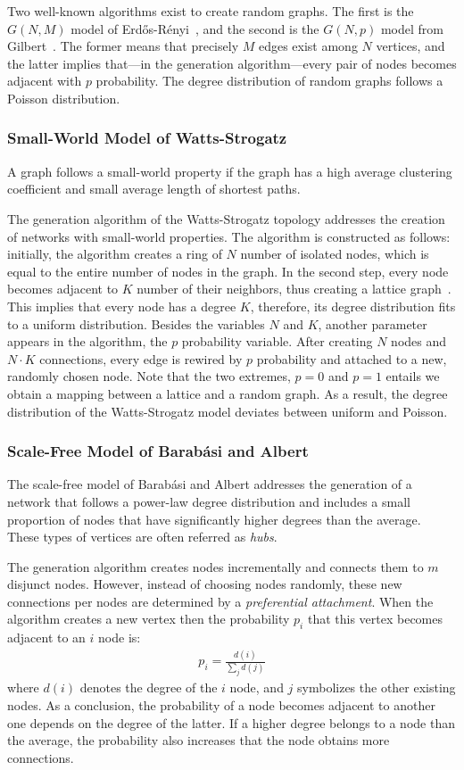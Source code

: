 Two well-known algorithms exist to create random graphs. The first is the $G(N, M)$ model of Erdős-Rényi~\cite{erdos_random}, and the second is the $G(N,p)$ model from Gilbert~\cite{gilbert_random}. The former means that precisely $M$ edges exist among $N$ vertices, and the latter implies that---in the generation algorithm---every pair of nodes becomes adjacent with $p$ probability. The degree distribution of random graphs follows a Poisson distribution.

\subsubsection{Small-World Model of Watts-Strogatz}

A graph follows a small-world property if the graph has a high average clustering coefficient and small average length of shortest paths.

The generation algorithm of the Watts-Strogatz topology addresses the creation of networks with small-world properties. The algorithm is constructed as follows: initially, the algorithm creates a ring of $N$ number of isolated nodes, which is equal to the entire number of nodes in the graph. In the second step, every node becomes adjacent to $K$ number of their neighbors, thus creating a lattice graph~\cite{lattice}. This implies that every node has a degree $K$, therefore, its degree distribution fits to a uniform distribution. Besides the variables $N$ and $K$, another parameter appears in the algorithm, the $p$ probability variable. After creating $N$ nodes and $N \cdot K$ connections, every edge is rewired by $p$ probability and attached to a new, randomly chosen node. Note that the two extremes, $p=0$ and $p=1$ entails we obtain a mapping between a lattice and a random graph. As a result, the degree distribution of the Watts-Strogatz model deviates between uniform and Poisson.

\subsubsection{Scale-Free Model of Barabási and Albert}

The scale-free model of Barabási and Albert addresses the generation of a network that follows a power-law degree distribution and includes a small proportion of nodes that have significantly higher degrees than the average. These types of vertices are often referred as \textit{hubs}.

The generation algorithm creates nodes incrementally and connects them to $m$ disjunct nodes. However, instead of choosing nodes randomly, these new connections per nodes are determined by a \textit{preferential attachment}. When the algorithm creates a new vertex then the probability $p_i$ that this vertex becomes adjacent to an $i$ node is:
\begin{align}
	p_i = \frac{d(i)}{\sum_j d(j)}
\end{align}
where $d(i)$ denotes the degree of the $i$ node, and $j$ symbolizes the other existing nodes. As a conclusion, the probability of a node becomes adjacent to another one depends on the degree of the latter. If a higher degree belongs to a node than the average, the probability also increases that the node obtains more connections.

